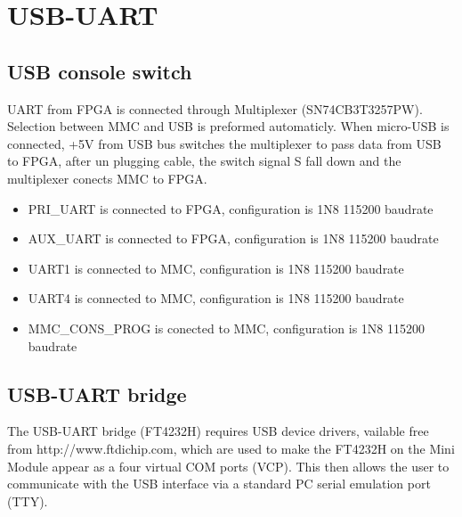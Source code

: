 \section{USB-UART}
\subsection{USB console switch}

UART from FPGA is connected through Multiplexer (SN74CB3T3257PW). Selection between MMC and USB is preformed automaticly. When micro-USB is connected, +5V from USB bus  switches the multiplexer to pass data from USB to FPGA, after un plugging cable, the switch signal S fall down and the multiplexer conects MMC to FPGA.\\

\begin{itemize}
	\item PRI\_UART is connected to FPGA, configuration is 1N8 115200 baudrate
	\item AUX\_UART is connected to FPGA, configuration is 1N8 115200 baudrate
	\item UART1 is connected to MMC, configuration is 1N8 115200 baudrate
	\item UART4 is connected to MMC, configuration is 1N8 115200 baudrate
	\item MMC\_CONS\_PROG is conected to MMC, configuration is 1N8 115200 baudrate
\end{itemize}

\subsection{USB-UART bridge}

The USB-UART bridge (FT4232H) requires USB device drivers, vailable free from http://www.ftdichip.com,
which are used to make the FT4232H on the Mini Module appear as a four virtual COM ports (VCP). This
then allows the user to communicate with the USB interface via a standard PC serial emulation port
(TTY).\\

